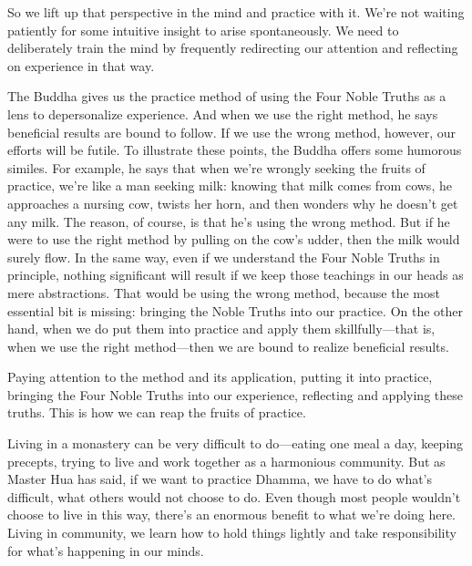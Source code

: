 So we lift up that perspective in the mind and practice with it. We're 
not waiting patiently for some intuitive insight to arise 
spontaneously. We need to deliberately train the mind by frequently 
redirecting our attention and reflecting on experience in that way.

The Buddha gives us the practice method of using the Four Noble Truths 
as a lens to depersonalize experience. And when we use the right 
method, he says beneficial results are bound to follow. If we use the 
wrong method, however, our efforts will be futile. To illustrate these 
points, the Buddha offers some humorous similes. For example, he says 
that when we're wrongly seeking the fruits of practice, we're like a 
man seeking milk: knowing that milk comes from cows, he approaches a 
nursing cow, twists her horn, and then wonders why he doesn't get any 
milk. The reason, of course, is that he's using the wrong method. But 
if he were to use the right method by pulling on the cow's udder, then 
the milk would surely flow. In the same way, even if we understand the 
Four Noble Truths in principle, nothing significant will result if we 
keep those teachings in our heads as mere abstractions. That would be 
using the wrong method, because the most essential bit is missing: 
bringing the Noble Truths into our practice. On the other hand, when we 
do put them into practice and apply them skillfully---that is, when we 
use the right method---then we are bound to realize beneficial results.

Paying attention to the method and its application, putting it into 
practice, bringing the Four Noble Truths into our experience, 
reflecting and applying these truths. This is how we can reap the 
fruits of practice.


Living in a monastery can be very difficult to do---eating one meal a 
day, keeping precepts, trying to live and work together as a harmonious 
community. But as Master Hua has said, if we want to practice Dhamma, 
we have to do what's difficult, what others would not choose to do. 
Even though most people wouldn't choose to live in this way, there's an 
enormous benefit to what we're doing here. Living in community, we 
learn how to hold things lightly and take responsibility for what's 
happening in our minds.

